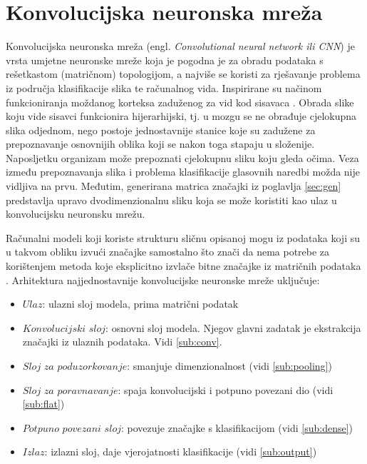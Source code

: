 \section{Konvolucijska neuronska mreža}
\label{sec:cnn}

Konvolucijska neuronska mreža (engl. \textit{Convolutional neural network ili CNN}) je vrsta 
umjetne neuronske mreže koja je pogodna je za obradu podataka s rešetkastom (matričnom)
topologijom, a najviše se koristi za rješavanje problema iz područja klasifikacije slika
te računalnog vida. Inspirirane su načinom funkcioniranja moždanog korteksa 
zaduženog za vid kod sisavaca \cite{pycodemates}. Obrada slike koju vide sisavci
funkcionira hijerarhijski, tj. u mozgu se ne obrađuje cjelokupna slika odjednom,
nego postoje jednostavnije stanice koje su zadužene za prepoznavanje osnovnijih
oblika koji se nakon toga stapaju u složenije. Naposljetku 
organizam može prepoznati cjelokupnu sliku koju gleda očima.
Veza između prepoznavanja slika i problema klasifikacije glasovnih naredbi možda nije
vidljiva na prvu. Međutim, generirana matrica značajki iz poglavlja \ref{sec:gen} predstavlja
upravo dvodimenzionalnu
sliku koja se može koristiti kao ulaz u konvolucijsku neuronsku mrežu.

Računalni modeli koji koriste strukturu sličnu opisanoj mogu iz
podataka koji su u takvom obliku izvući značajke samostalno što znači da nema
potrebe za korištenjem metoda koje eksplicitno izvlače bitne značajke iz matričnih podataka
\cite{1}. Arhitektura najjednostavnije konvolucijske neuronske mreže
uključuje:

\begin{itemize}
    \item \(Ulaz\): ulazni sloj modela, prima matrični podatak
    \item \(Konvolucijski\) \(sloj\): osnovni sloj modela. Njegov glavni zadatak
          je ekstrakcija značajki iz ulaznih podataka. Vidi \ref{sub:conv}.
    \item \(Sloj\) \(za\) \(poduzorkovanje\): smanjuje dimenzionalnost (vidi \ref{sub:pooling})
    \item \(Sloj\) \(za\) \(poravnavanje\): spaja konvolucijski i potpuno povezani dio (vidi \ref{sub:flat})
    \item \(Potpuno\) \(povezani\) \(sloj\): povezuje značajke s klasifikacijom (vidi \ref{sub:dense})
    \item \(Izlaz\): izlazni sloj, daje vjerojatnosti klasifikacije (vidi \ref{sub:output})
\end{itemize}

